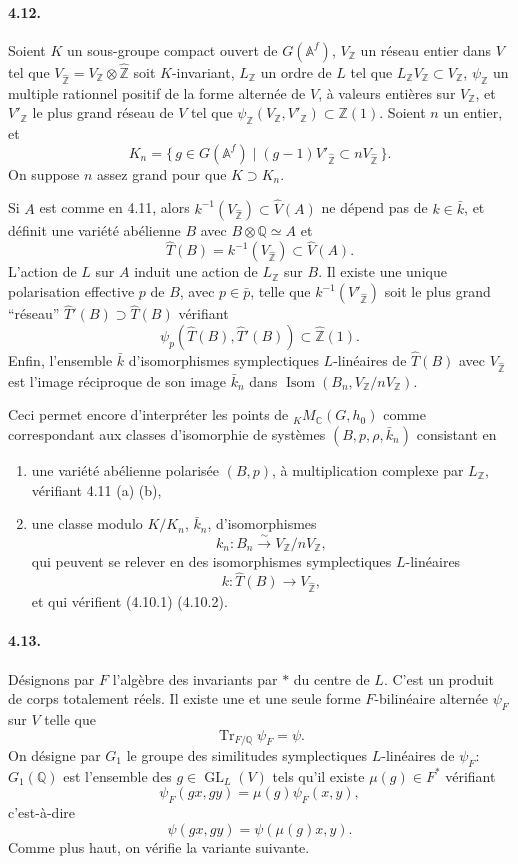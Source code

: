 \documentclass[10pt]{article}
\newcommand{\Af}{\mathbb A^f}
\newcommand{\C}{\mathbb C}
\newcommand{\Q}{\mathbb Q}
\newcommand{\Z}{\mathbb Z}
\newcommand{\GL}{\operatorname{GL}}
\newcommand{\Isom}{\operatorname{Isom}}
\newcommand{\Tr}{\operatorname{Tr}}
\begin{document}
\paragraph{4.12.} Soient $K$ un sous-groupe compact ouvert de $G(\Af)$, $V_\Z$ un réseau entier dans $V$ tel que $V_{\widehat{\Z}}=V_\Z\otimes\widehat{\Z}$ soit $K$-invariant, $L_\Z$ un ordre de $L$ tel que $L_\Z V_\Z\subset V_\Z$, $\psi_\Z$ un multiple rationnel positif de la forme alternée de $V$, à valeurs entières sur $V_\Z$, et $V'_\Z$ le plus grand réseau de $V$ tel que $\psi_\Z(V_\Z,V'_\Z)\subset \Z(1)$. Soient $n$ un entier, et
\[
K_n=\{\,g\in G(\Af)\mid (g-1)V'_{\widehat{\Z}}\subset nV_{\widehat{\Z}}\,\}.
\]
On suppose $n$ assez grand pour que $K\supset K_n$.

Si $A$ est comme en 4.11, alors $k^{-1}(V_{\widehat{\Z}})\subset\widehat V(A)$ ne dépend pas de $k\in\bar k$, et définit une variété abélienne $B$ avec $B\otimes\Q\simeq A$ et
\[
\widehat T(B)=k^{-1}(V_{\widehat{\Z}})\subset\widehat V(A).
\]
L'action de $L$ sur $A$ induit une action de $L_\Z$ sur $B$. Il existe une unique polarisation effective $p$ de $B$, avec $p\in\bar p$, telle que $k^{-1}(V'_{\widehat{\Z}})$ soit le plus grand ``réseau'' $\widehat T'(B)\supset\widehat T(B)$ vérifiant
\[
\psi_p(\widehat T(B),\widehat T'(B))\subset \widehat{\Z}(1).
\]
Enfin, l'ensemble $\bar k$ d'isomorphismes symplectiques $L$-linéaires de $\widehat T(B)$ avec $V_{\widehat{\Z}}$ est l'image réciproque de son image $\bar k_n$ dans $\Isom(B_n,V_\Z/nV_\Z)$.

Ceci permet encore d'interpréter les points de ${}_K M_{\C}(G,h_0)$ comme correspondant aux classes d'isomorphie de systèmes $(B,p,\rho,\bar k_n)$ consistant en
\begin{enumerate}[label=(\alph*)]
\item une variété abélienne polarisée $(B,p)$, à multiplication complexe par $L_\Z$, vérifiant 4.11 (a) (b),
\item une classe modulo $K/K_n$, $\bar k_n$, d'isomorphismes
\[
k_n:B_n\xrightarrow{\sim}V_\Z/nV_\Z,
\]
qui peuvent se relever en des isomorphismes symplectiques $L$-linéaires
\[
k:\widehat T(B)\longrightarrow V_{\widehat{\Z}},
\]
et qui vérifient (4.10.1) (4.10.2).
\end{enumerate}

\paragraph{4.13.} Désignons par $F$ l'algèbre des invariants par $*$ du centre de $L$. C'est un produit de corps totalement réels. Il existe une et une seule forme $F$-bilinéaire alternée $\psi_F$ sur $V$ telle que
\[
\Tr_{F/\Q}\psi_F=\psi.
\]
On désigne par $G_1$ le groupe des similitudes symplectiques $L$-linéaires de $\psi_F$: $G_1(\Q)$ est l'ensemble des $g\in\GL_L(V)$ tels qu'il existe $\mu(g)\in F^*$ vérifiant
\[
\tag{4.13.1}
\psi_F(gx,gy)=\mu(g)\psi_F(x,y),
\]
c'est-à-dire
\[
\tag{4.13.2}
\psi(gx,gy)=\psi(\mu(g)x,y).
\]
Comme plus haut, on vérifie la variante suivante.
\end{document}
